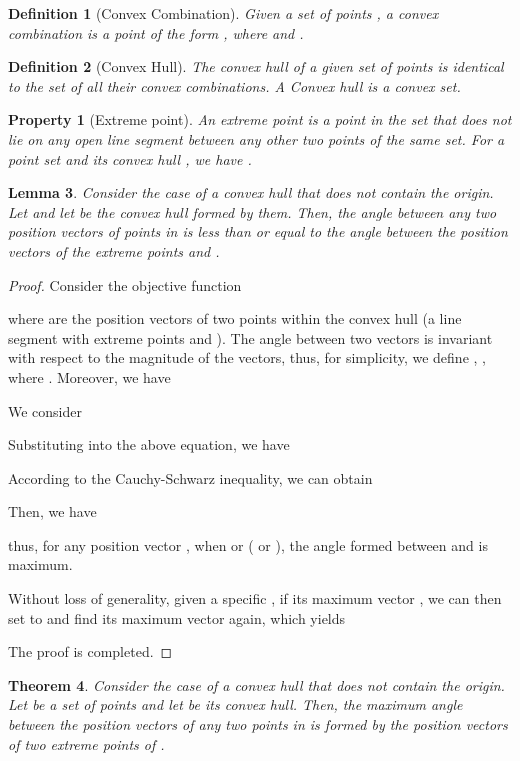\documentclass[10pt,twocolumn,letterpaper]{article}
\newtheorem{theorem}{Theorem}[subsection]
\newtheorem{lemma}[theorem]{Lemma}
\newtheorem{definition}[theorem]{Definition}
\newtheorem{proof}{Proof}[theorem]
\newtheorem{property}{Property}[theorem]
\begin{document}
\begin{definition}[Convex Combination]
Given a set of points , a convex combination is a point of the form , where  and .
\end{definition}

\begin{definition}[Convex Hull]
The convex hull  of a given set of points  is identical to the set of all their convex combinations. A Convex hull is a convex set.
\end{definition}

\begin{property}[Extreme point]
An extreme point  is a point in the set that does not lie on any open line segment between any other two points of the same set. For a point set  and its convex hull , we have .
\end{property}

\begin{lemma} 
\label{lemma:two}
Consider the case of a convex hull that does not contain the origin.
Let  and let  be the convex hull formed by them. Then, the angle between any two position vectors of points in  is less than or equal to the angle between the position vectors of the extreme points  and .
\end{lemma}

\begin{proof}
Consider the objective function

where  are the position vectors of two points  within the convex hull  (a line segment with extreme points  and ). The angle between two vectors is invariant with respect to the magnitude of the vectors, thus, for simplicity, we define , , where .
Moreover, we have 

We consider 

Substituting  into the above equation, we have 

According to the Cauchy-Schwarz inequality, we can obtain 

Then, we have

thus, for any position vector , when  or  ( or ), the angle formed between  and  is maximum.

Without loss of generality, given a specific , if its maximum vector , we can then set  to  and find its maximum vector again, which yields

The proof is completed.
\end{proof}

\begin{theorem}
\label{theo:gen}
Consider the case of a convex hull that does not contain the origin. Let  be a set of points and let  be its convex hull. Then, the maximum angle between the position vectors of any two points in  is formed by the position vectors of two extreme points of .
\end{theorem}
\end{document}
